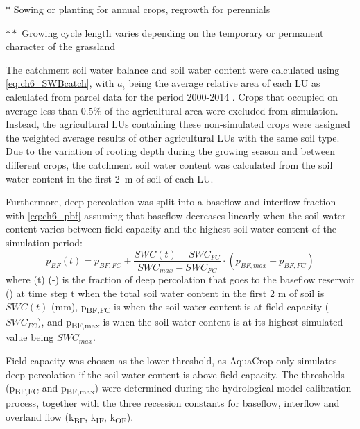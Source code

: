 \begin{landscape}
\begin{table}[htbp]
{\begin{threeparttable}
\begin{tabular}{lrrrrrrrr}
\bottomrule				
    	\end{tabular}%
    	\begin{tablenotes}
        \item[$\ast$] Sowing or planting for annual crops, regrowth for perennials
        \item[$\ast\ast$] Growing cycle length varies depending on the temporary or permanent character of the grassland 
    	\end{tablenotes}
        \end{threeparttable}
            }
  \label{tab:ch6_croppar}%
  \setlength{\tabcolsep}{6pt}
\end{table}%
\end{landscape}
 
The catchment soil water balance and soil water content were calculated using \autoref{eq:ch6_SWBcatch}, with $a_i$ being the average relative area of each LU as calculated from parcel data for the period 2000-2014 \parencite{vlm2014}. Crops that occupied on average less than 0.5\% of the agricultural area were excluded from simulation. Instead, the agricultural LUs containing these non-simulated crops were assigned the weighted average results of other agricultural LUs with the same soil type. Due to the variation of rooting depth during the growing season and between different crops, the catchment soil water content was calculated from the soil water content in the first \SI{2}{m} of soil of each LU. 

Furthermore, deep percolation was split into a baseflow and interflow fraction with \autoref{eq:ch6_pbf} assuming that baseflow decreases linearly when the soil water content varies between field capacity and the highest soil water content of the simulation period:
\begin{equation}
 p_{BF}(t)=p_{BF,FC} + \dfrac{SWC(t)-SWC_{FC}}{SWC_{max}-SWC_{FC}} \cdot \left(p_{BF,max} -p_{BF,FC}\right) 
  \label{eq:ch6_pbf}
\end{equation}
where \pbf(t) (-) is the fraction of deep percolation that goes to the baseflow reservoir (\pbf) at time step t when the total soil water content in the first 2 m of soil is $SWC(t)$ (mm), p\textsubscript{BF,FC} is \pbf when the soil water content is at field capacity ($SWC_{FC}$), and p\textsubscript{BF,max} is \pbf when the soil water content is at its highest simulated value being $SWC_{max}$. 

Field capacity was chosen as the lower threshold, as AquaCrop only simulates deep percolation if the soil water content is above field capacity. The \pbf thresholds (p\textsubscript{BF,FC} and p\textsubscript{BF,max}) were determined during the hydrological model calibration process, together with the three recession constants for baseflow, interflow and overland flow (k\textsubscript{BF}, k\textsubscript{IF}, k\textsubscript{OF}).

